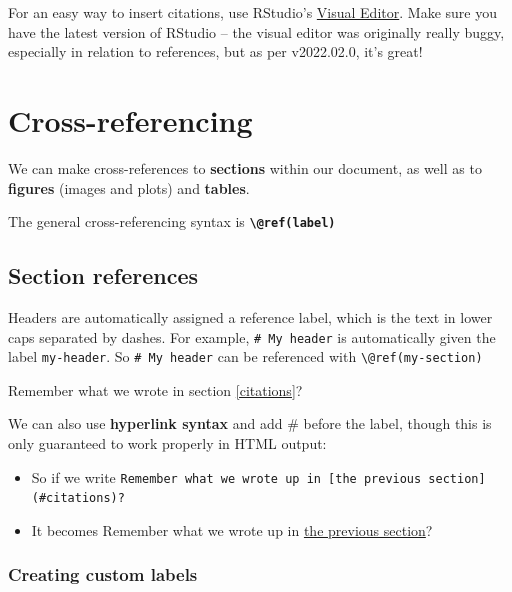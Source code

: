 \documentclass[a4paper, nobind]{templates/ociamthesis}
\providecommand{\tightlist}{%
  \setlength{\itemsep}{0pt}\setlength{\parskip}{0pt}}
\begin{document}
For an easy way to insert citations, use RStudio's \href{https://rstudio.github.io/visual-markdown-editing/citations.html}{Visual Editor}.
Make sure you have the latest version of RStudio -- the visual editor was originally really buggy, especially in relation to references, but as per v2022.02.0, it's great!

\hypertarget{cross-referencing}{%
\section{Cross-referencing}\label{cross-referencing}}

We can make cross-references to \textbf{sections} within our document, as well as to \textbf{figures} (images and plots) and \textbf{tables}.

The general cross-referencing syntax is \textbf{\texttt{\textbackslash{}@ref(label)}}

\hypertarget{section-references}{%
\subsection{Section references}\label{section-references}}

Headers are automatically assigned a reference label, which is the text in lower caps separated by dashes. For example, \texttt{\#\ My\ header} is automatically given the label \texttt{my-header}. So \texttt{\#\ My\ header} can be referenced with \texttt{\textbackslash{}@ref(my-section)}

Remember what we wrote in section \ref{citations}?

We can also use \textbf{hyperlink syntax} and add \# before the label, though this is only guaranteed to work properly in HTML output:

\begin{itemize}
\tightlist
\item
  So if we write \texttt{Remember\ what\ we\ wrote\ up\ in\ {[}the\ previous\ section{]}(\#citations)?}
\item
  It becomes Remember what we wrote up in \protect\hyperlink{citations}{the previous section}?
\end{itemize}

\hypertarget{creating-custom-labels}{%
\subsubsection{Creating custom labels}\label{creating-custom-labels}}
\end{document}
